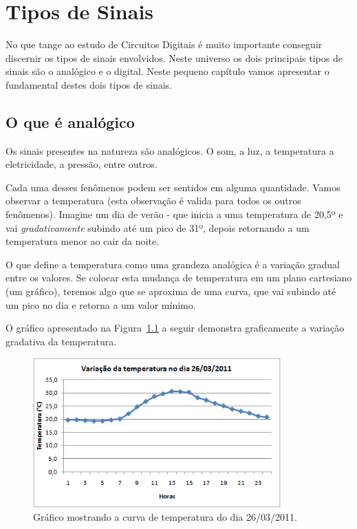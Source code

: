 \chapter{Tipos de Sinais}
\label{sinais}

No que tange ao estudo de Circuitos Digitais é muito importante conseguir discernir os tipos de sinais envolvidos. Neste universo os dois principais tipos de sinais são o analógico e o digital. Neste pequeno capítulo vamos apresentar o fundamental destes dois tipos de sinais.


\section{O que é analógico}
\label{sinalAnalogico}

Os sinais presentes na natureza são analógicos. O som, a luz, a temperatura a eletricidade, a pressão, entre outros. 

Cada uma desses fenômenos podem ser sentidos em alguma quantidade. Vamos observar a temperatura (esta observação é valida para todos os outros fenômenos). Imagine um dia de verão - que inicia a uma temperatura de 20,5º e vai \emph{gradativamente} subindo até um pico de 31º, depois retornando a um temperatura menor ao cair da noite.

O que define a temperatura como uma grandeza analógica é a variação gradual entre os valores. Se colocar esta mudança de temperatura em um plano cartesiano (um gráfico), teremos algo que se aproxima de uma curva, que vai subindo até um pico no dia e retorna a um valor mínimo.

O gráfico apresentado na Figura~\ref{fig:temperatura} a seguir demonstra graficamente a variação gradativa da temperatura.

\begin{figure}[h]
	\begin{center}
		\includegraphics[width=0.85\textwidth]{img/sinais/temperatura.png}
		\caption{Gráfico mostrando a curva de temperatura do dia 26/03/2011.}
		\label{fig:temperatura}
	\end{center}
\end{figure}

